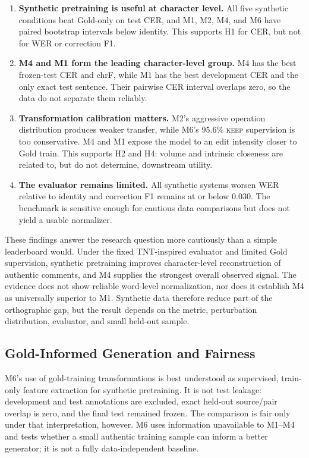 \documentclass[12pt, a4paper, twoside, openany]{report}
\begin{document}
\begin{enumerate}
	\item \textbf{Synthetic pretraining is useful at character level.} All five synthetic conditions beat Gold-only on test CER, and M1, M2, M4, and M6 have paired bootstrap intervals below identity. This supports H1 for CER, but not for WER or correction F1.
	\item \textbf{M4 and M1 form the leading character-level group.} M4 has the best frozen-test CER and chrF, while M1 has the best development CER and the only exact test sentence. Their pairwise CER interval overlaps zero, so the data do not separate them reliably.
	\item \textbf{Transformation calibration matters.} M2's aggressive operation distribution produces weaker transfer, while M6's 95.6\% \textsc{keep} supervision is too conservative. M4 and M1 expose the model to an edit intensity closer to Gold train. This supports H2 and H4: volume and intrinsic closeness are related to, but do not determine, downstream utility.
	\item \textbf{The evaluator remains limited.} All synthetic systems worsen WER relative to identity and correction F1 remains at or below 0.030. The benchmark is sensitive enough for cautious data comparisons but does not yield a usable normalizer.
\end{enumerate}

These findings answer the research question more cautiously than a simple leaderboard would. Under the fixed TNT-inspired evaluator and limited Gold supervision, synthetic pretraining improves character-level reconstruction of authentic comments, and M4 supplies the strongest overall observed signal. The evidence does not show reliable word-level normalization, nor does it establish M4 as universally superior to M1. Synthetic data therefore reduce part of the orthographic gap, but the result depends on the metric, perturbation distribution, evaluator, and small held-out sample.

\subsection{Gold-Informed Generation and Fairness}

M6's use of gold-training transformations is best understood as supervised, train-only feature extraction for synthetic pretraining. It is not test leakage: development and test annotations are excluded, exact held-out source/pair overlap is zero, and the final test remained frozen. The comparison is fair only under that interpretation, however. M6 uses information unavailable to M1--M4 and tests whether a small authentic training sample can inform a better generator; it is not a fully data-independent baseline.
\end{document}
